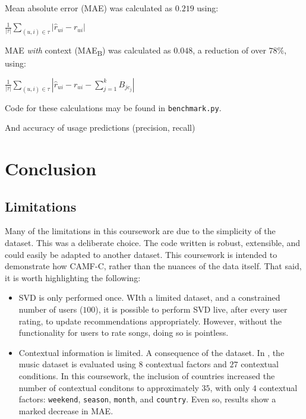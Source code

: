 \documentclass[conference]{IEEEtran}
\begin{document}
Mean absolute error (MAE) was calculated as $0.219$ using:

\begin{center}

$\frac{1}{|\tau|} \sum_{(u, i) \in \tau} |\hat{r}_{ui} - r_{ui}|$

\end{center} 

MAE \textit{with} context (MAE\textsubscript{B}) was calculated as $0.048$, a reduction of over $78\%$, using:

\begin{center}

$\frac{1}{|\tau|} \sum_{(u, i) \in \tau} |\hat{r}_{ui} - r_{ui} - \sum_{j=1}^{k} B_{jc_j}|$

\end{center}

Code for these calculations may be found in \verb|benchmark.py|.

And accuracy of usage predictions (precision, recall)


\section{Conclusion}

\subsection{Limitations}

Many of the limitations in this coursework are due to the simplicity of the dataset. This was a deliberate choice. The code written is robust, extensible, and could easily be adapted to another dataset. This coursework is intended to demonstrate how CAMF-C, rather than the nuances of the data itself. That said, it is worth highlighting the following:

\begin{itemize}

\item{SVD is only performed once. WIth a limited dataset, and a constrained number of users ($100$), it is possible to perform SVD live, after every user rating, to update recommendations appropriately. However, without the functionality for users to rate songs, doing so is pointless.}
\item{Contextual information is limited. A consequence of the dataset. In \cite{baltrunas_et_al_2011}, the music dataset is evaluated using $8$ contextual factors and $27$ contextual conditions. In this coursework, the inclusion of countries increased the number of contextual conditons to approximately $35$, with only $4$ contextual factors: \verb|weekend|, \verb|season|, \verb|month|, and \verb|country|. Even so, results show a marked decrease in MAE.}

\end{itemize}
\end{document}
